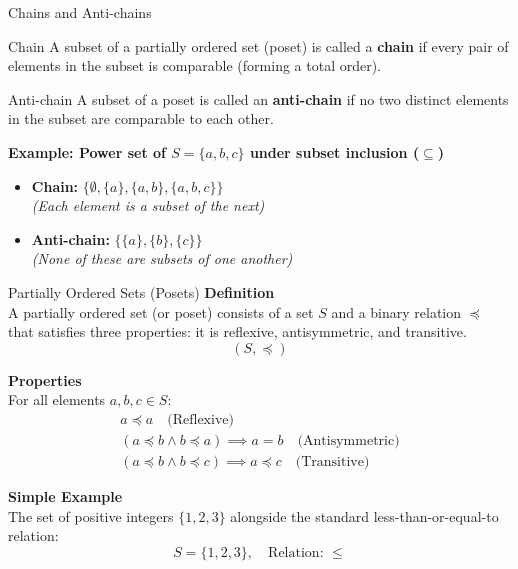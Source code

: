 \documentclass{beamer}
\begin{document}
\begin{frame}{Chains and Anti-chains}
\begin{block}{Chain}
A subset of a partially ordered set (poset) is called a \textbf{chain} if every pair of elements in the subset is comparable (forming a total order).
\end{block}
\begin{block}{Anti-chain}
A subset of a poset is called an \textbf{anti-chain} if no two distinct elements in the subset are comparable to each other.
\end{block}
\vspace{0.2cm}
\textbf{Example: Power set of $S = \{a, b, c\}$ under subset inclusion ($\subseteq$)}
\begin{itemize}
    \item \textbf{Chain:} $\{\emptyset, \{a\}, \{a, b\}, \{a, b, c\}\}$ \\ \small \textit{(Each element is a subset of the next)}
    \item \textbf{Anti-chain:} $\{\{a\}, \{b\}, \{c\}\}$ \\ \small \textit{(None of these are subsets of one another)}
\end{itemize}
\end{frame}

\begin{frame}{Partially Ordered Sets (Posets)}
    \textbf{Definition} \\
    \hspace*{1.5em}A partially ordered set (or poset) consists of a set $S$ and a binary relation $\preceq$ that satisfies three properties: it is reflexive, antisymmetric, and transitive.
    \[ (S, \preceq) \]
    
    \textbf{Properties} \\
    \hspace*{1.5em}For all elements $a, b, c \in S$:
    \begin{gather*}
        a \preceq a \quad \text{(Reflexive)} \\
        (a \preceq b \land b \preceq a) \implies a = b \quad \text{(Antisymmetric)} \\
        (a \preceq b \land b \preceq c) \implies a \preceq c \quad \text{(Transitive)}
    \end{gather*}
    
    \textbf{Simple Example} \\
    \hspace*{1.5em}The set of positive integers $\{1, 2, 3\}$ alongside the standard less-than-or-equal-to relation:
    \[ S = \{1, 2, 3\}, \quad \text{Relation: } \le \]
\end{frame}
\end{document}

